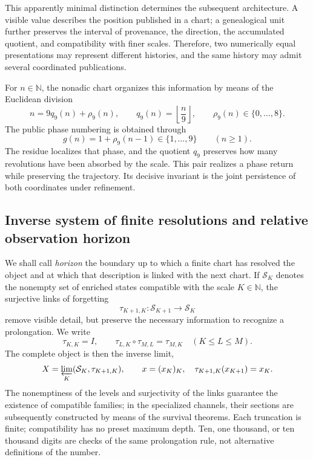 This apparently minimal distinction determines the subsequent architecture.
A visible value describes the position published in a chart; a genealogical
unit further preserves the interval of provenance, the direction, the
accumulated quotient, and compatibility with finer scales. Therefore, two
numerically equal presentations may represent different histories,
and the same history may admit several coordinated publications.

For \(n\in\mathbb N\), the nonadic chart organizes this information by means of
the Euclidean division
\begin{equation}\label{p12-83-c0-s1:eq:horizonte-division-nonadica}
 n=9q_9(n)+\rho_9(n),
 \qquad q_9(n)=\left\lfloor\frac n9\right\rfloor,
 \qquad \rho_9(n)\in\{0,\ldots,8\}.
\end{equation}
The public phase numbering is obtained through
\[
 g(n)=1+\rho_9(n-1)\in\{1,\ldots,9\}\qquad(n\geq1).
\]
The residue localizes that phase, and the quotient \(q_9\) preserves how many revolutions
have been absorbed by the scale. This pair realizes a phase return
while preserving the trajectory. Its decisive invariant is the joint persistence
of both coordinates under refinement.

\subsection*{Inverse system of finite resolutions and relative observation horizon}

We shall call \emph{horizon} the boundary up to which a finite chart has
resolved the object and at which that description is linked with the
next chart. If
\(\mathcal S_K\) denotes the nonempty set of enriched states
compatible with the scale \(K\in\mathbb N\), the surjective links of
forgetting
\[
 \tau_{K+1,K}:\mathcal S_{K+1}\longrightarrow\mathcal S_K
\]
remove visible detail, but preserve the necessary information to
recognize a prolongation. We write
\[
 \tau_{K,K}=I,\qquad
 \tau_{L,K}\circ\tau_{M,L}=\tau_{M,K}
 \quad(K\leq L\leq M).
\]
The complete object is then the inverse limit,
\begin{equation}\label{p12-83-c0-s1:eq:horizonte-limite-inverso}
 X=\varprojlim_K(\mathcal S_K,\tau_{K+1,K}),
 \qquad
 x=(x_K)_K,\quad \tau_{K+1,K}(x_{K+1})=x_K.
\end{equation}
The nonemptiness of the levels and surjectivity of the links guarantee
the existence of compatible families; in the specialized channels, their
sections are subsequently constructed by means of the survival theorems.
Each truncation is finite; compatibility has no preset maximum
depth. Ten, one thousand, or ten thousand digits are checks of the same
prolongation rule, not alternative definitions of the number.

